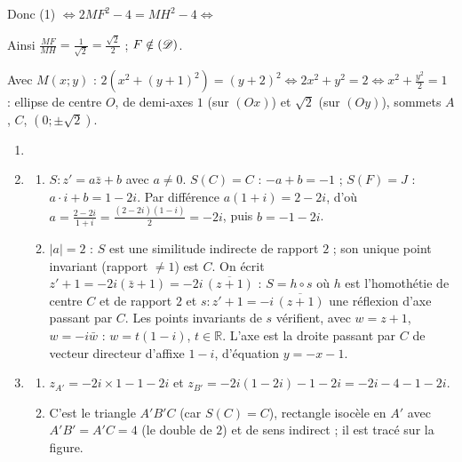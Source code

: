 \begin{description}
\begin{enumerate}
\begin{enumerate}
				Donc (1) $\iff 2MF^2 - 4 = MH^2 - 4 \iff$ \par\noindent{}
				Ainsi $\frac{MF}{MH} = \frac{1}{\sqrt{2}} = \frac{\sqrt{2}}{2}$ ; $F \notin (\mathscr{D})$.
				\par\noindent{}
				Avec $M(x;y)$ : $2\left(x^2 + (y+1)^2\right) = (y+2)^2 \iff 2x^2 + y^2 = 2 \iff x^2 + \frac{y^2}{2} = 1$ :
				ellipse de centre $O$, de demi-axes $1$ (sur $(Ox)$) et $\sqrt{2}$ (sur $(Oy)$), sommets $A$, $C$, $(0;\pm\sqrt{2})$.
		\end{enumerate}
	\end{enumerate}
	\item[Partie 2]
	\begin{enumerate}
		\item {}
		\item
		\begin{enumerate}
			\item {}
				$S : z' = a\bar{z} + b$ avec $a \neq 0$. $S(C) = C$ : $-a + b = -1$ ; $S(F) = J$ : $a \cdot i + b = 1 - 2i$.
				Par différence $a(1 + i) = 2 - 2i$, d'où $a = \frac{2 - 2i}{1 + i} = \frac{(2 - 2i)(1 - i)}{2} = -2i$, puis $b = -1 - 2i$.
				\par\noindent{}
			\item {}
				$|a| = 2$ : $S$ est une similitude indirecte de rapport $2$ ; son unique point invariant (rapport $\neq 1$) est $C$.
				On écrit $z' + 1 = -2i\left(\bar{z} + 1\right) = -2i\,\overline{(z + 1)}$ : $S = h \circ s$ où $h$ est l'homothétie de centre $C$ et de rapport $2$ et $s : z' + 1 = -i\,\overline{(z+1)}$ une réflexion d'axe passant par $C$.
				Les points invariants de $s$ vérifient, avec $w = z + 1$, $w = -i\bar{w}$ : $w = t(1 - i)$, $t \in \mathbb{R}$. L'axe est la droite passant par $C$ de vecteur directeur d'affixe $1 - i$, d'équation $y = -x - 1$.
				\par\noindent{}
		\end{enumerate}
		\item
		\begin{enumerate}
			\item {}
				$z_{A'} = -2i \times 1 - 1 - 2i$ et $z_{B'} = -2i(1 - 2i) - 1 - 2i = -2i - 4 - 1 - 2i$.
				\par\noindent{}
			\item {}
				C'est le triangle $A'B'C$ (car $S(C) = C$), rectangle isocèle en $A'$ avec $A'B' = A'C = 4$ (le double de $2$) et de sens indirect ; il est tracé sur la figure.
		\end{enumerate}
	\end{enumerate}
\end{description}

